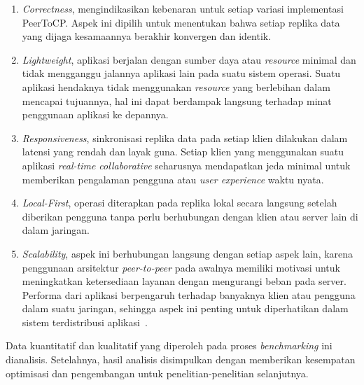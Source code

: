 \begin{enumerate}
    \item \textit{Correctness}, mengindikasikan kebenaran untuk setiap variasi implementasi PeerToCP. Aspek ini dipilih untuk menentukan bahwa setiap replika data yang dijaga kesamaannya berakhir konvergen dan identik.
    \item \textit{Lightweight}, aplikasi berjalan dengan sumber daya atau \textit{resource} minimal dan tidak mengganggu jalannya aplikasi lain pada suatu sistem operasi. Suatu aplikasi hendaknya tidak menggunakan \textit{resource} yang berlebihan dalam mencapai tujuannya, hal ini dapat berdampak langsung terhadap minat penggunaan aplikasi ke depannya.
    \item \textit{Responsiveness}, sinkronisasi replika data pada setiap klien dilakukan dalam latensi yang rendah dan layak guna. Setiap klien yang menggunakan suatu aplikasi \textit{real-time collaborative} seharusnya mendapatkan jeda minimal untuk memberikan pengalaman pengguna atau \textit{user experience} waktu nyata.
    \item \textit{Local-First}, operasi diterapkan pada replika lokal secara langsung setelah diberikan pengguna tanpa perlu berhubungan dengan klien atau server lain di dalam jaringan.
    \item \textit{Scalability}, aspek ini berhubungan langsung dengan setiap aspek lain, karena penggunaan arsitektur \textit{peer-to-peer} pada awalnya memiliki motivasi untuk meningkatkan ketersediaan layanan dengan mengurangi beban pada server. Performa dari aplikasi berpengaruh terhadap banyaknya klien atau pengguna dalam suatu jaringan, sehingga aspek ini penting untuk diperhatikan dalam sistem terdistribusi aplikasi~\citep{leibnitz2007peer}.
\end{enumerate}

Data kuantitatif dan kualitatif yang diperoleh pada proses \textit{benchmarking} ini dianalisis. Setelahnya, hasil analisis disimpulkan dengan memberikan kesempatan optimisasi dan pengembangan untuk penelitian-penelitian selanjutnya.
